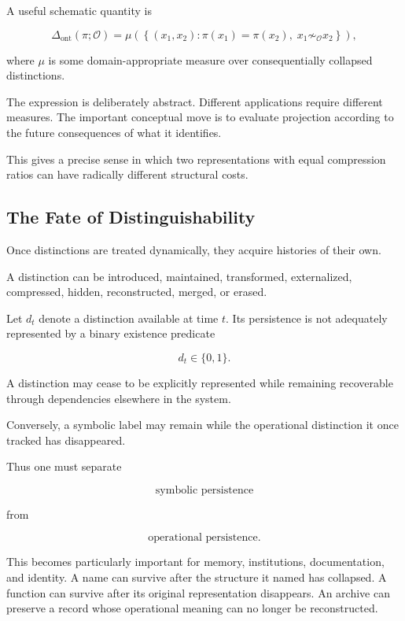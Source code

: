 \documentclass[11pt]{article}
\theoremstyle{remark}
\begin{document}
A useful schematic quantity is

\begin{equation}
\Delta_{\mathrm{ont}}(\pi;\mathcal{O})
=
\mu
\left(
\left\{
(x_1,x_2):
\pi(x_1)=\pi(x_2),
\;
x_1\not\sim_{\mathcal{O}}x_2
\right\}
\right),
\end{equation}

where $\mu$ is some domain-appropriate measure over consequentially collapsed distinctions.

The expression is deliberately abstract. Different applications require different measures. The important conceptual move is to evaluate projection according to the future consequences of what it identifies.

This gives a precise sense in which two representations with equal compression ratios can have radically different structural costs.

\subsection{The Fate of Distinguishability}

Once distinctions are treated dynamically, they acquire histories of their own.

A distinction can be introduced, maintained, transformed, externalized, compressed, hidden, reconstructed, merged, or erased.

Let $d_t$ denote a distinction available at time $t$. Its persistence is not adequately represented by a binary existence predicate

\begin{equation}
d_t\in\{0,1\}.
\end{equation}

A distinction may cease to be explicitly represented while remaining recoverable through dependencies elsewhere in the system.

Conversely, a symbolic label may remain while the operational distinction it once tracked has disappeared.

Thus one must separate

\begin{equation}
\text{symbolic persistence}
\end{equation}

from

\begin{equation}
\text{operational persistence}.
\end{equation}

This becomes particularly important for memory, institutions, documentation, and identity. A name can survive after the structure it named has collapsed. A function can survive after its original representation disappears. An archive can preserve a record whose operational meaning can no longer be reconstructed.
\end{document}
